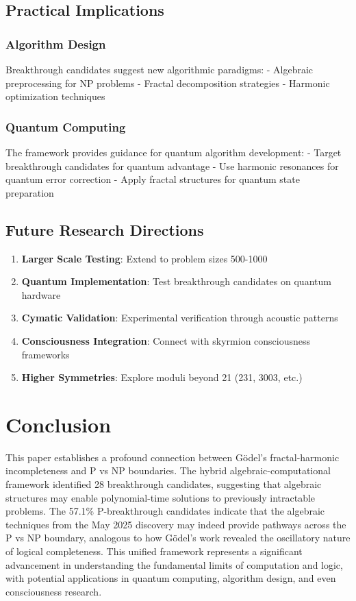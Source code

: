 \documentclass[12pt]{article}
\begin{document}
\subsection{Practical Implications}

\subsubsection{Algorithm Design}
Breakthrough candidates suggest new algorithmic paradigms:
- Algebraic preprocessing for NP problems
- Fractal decomposition strategies
- Harmonic optimization techniques

\subsubsection{Quantum Computing}
The framework provides guidance for quantum algorithm development:
- Target breakthrough candidates for quantum advantage
- Use harmonic resonances for quantum error correction
- Apply fractal structures for quantum state preparation

\subsection{Future Research Directions}

\begin{enumerate}
    \item \textbf{Larger Scale Testing}: Extend to problem sizes 500-1000
    \item \textbf{Quantum Implementation}: Test breakthrough candidates on quantum hardware
    \item \textbf{Cymatic Validation}: Experimental verification through acoustic patterns
    \item \textbf{Consciousness Integration}: Connect with skyrmion consciousness frameworks
    \item \textbf{Higher Symmetries}: Explore moduli beyond 21 (231, 3003, etc.)
\end{enumerate}

\section{Conclusion}

This paper establishes a profound connection between Gödel's fractal-harmonic incompleteness and P vs NP boundaries. The hybrid algebraic-computational framework identified 28 breakthrough candidates, suggesting that algebraic structures may enable polynomial-time solutions to previously intractable problems. The 57.1\% P-breakthrough candidates indicate that the algebraic techniques from the May 2025 discovery may indeed provide pathways across the P vs NP boundary, analogous to how Gödel's work revealed the oscillatory nature of logical completeness. This unified framework represents a significant advancement in understanding the fundamental limits of computation and logic, with potential applications in quantum computing, algorithm design, and even consciousness research.
\end{document}
